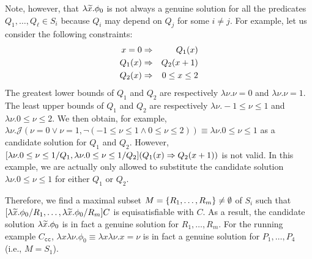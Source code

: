 Note, however, that \(\lambda \widetilde{x}.\phi_0\) is not always a genuine 
solution for all the predicates \(Q_1,\dots,Q_{\ell} \in S_i\) because 
\(Q_i\) may depend on \(Q_j\) for some \(i \neq j\).  For example, let 
us consider the following constraints:
\begin{eqnarray*}
x=0 &\Rightarrow& Q_1(x) \\
Q_1(x) &\Rightarrow& Q_2(x+1) \\
Q_2(x) &\Rightarrow& 0 \leq x \leq 2
\end{eqnarray*}
The greatest lower bounds of \(Q_1\) and \(Q_2\) are respectively 
\(\lambda \nu.\nu=0\) and \(\lambda \nu.\nu=1\).  The least upper bounds 
of \(Q_1\) and \(Q_2\) are respectively \(\lambda \nu.-1 \leq \nu\leq 1\) 
and \(\lambda \nu.0 \leq \nu \leq 2\).  We then obtain, for example, 
\(\lambda \nu.\mathcal{J}(\nu=0 \lor \nu=1,\neg (-1 \leq \nu\leq 1 \land 
0 \leq \nu \leq 2)) \equiv \lambda \nu.0 \leq \nu \leq 1\) as a 
candidate solution for \(Q_1\) and \(Q_2\).  However, \([\lambda\nu.0 
\leq \nu \leq 1/Q_1,\lambda \nu.0 \leq \nu \leq 1/Q_2](Q_1(x) \Rightarrow 
Q_2(x+1))\) is not valid.  In this example, we are actually only allowed 
to substitute the candidate solution \(\lambda \nu.0 \leq \nu\leq 1\) 
for either \(Q_1\) or \(Q_2\).

Therefore, we find a maximal subset \(M=\{{R_1,\dots,R_m}\} \neq 
\emptyset\) of \(S_i\) such that 
\([\lambda\widetilde{x}.\phi_0/R_1,\dots,\lambda\widetilde{x}.\phi_0/R_m]C\) is 
equisatisfiable with \(C\).  As a result, the candidate solution 
\(\lambda\widetilde{x}.\phi_0\) is in fact a genuine solution for 
\(R_1,\dots,R_m\).
%
%
For the running example \(C_{\texttt{cc}}\), \(\lambda x \lambda 
\nu.\phi_0 \equiv \lambda x \lambda \nu.x=\nu\) is in fact a genuine 
solution for \(P_1,\dots,P_4\) (i.e., \(M=S_1\)).

